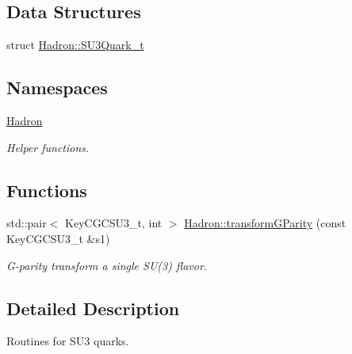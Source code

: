 \subsection*{Data Structures}
\begin{DoxyCompactItemize}
\item 
struct \mbox{\hyperlink{structHadron_1_1SU3Quark__t}{Hadron\+::\+S\+U3\+Quark\+\_\+t}}
\end{DoxyCompactItemize}
\subsection*{Namespaces}
\begin{DoxyCompactItemize}
\item 
 \mbox{\hyperlink{namespaceHadron}{Hadron}}
\begin{DoxyCompactList}\small\item\em Helper functions. \end{DoxyCompactList}\end{DoxyCompactItemize}
\subsection*{Functions}
\begin{DoxyCompactItemize}
\item 
std\+::pair$<$ Key\+C\+G\+C\+S\+U3\+\_\+t, int $>$ \mbox{\hyperlink{namespaceHadron_ae0f88dc43657f9dd4f118d41608859cc}{Hadron\+::transform\+G\+Parity}} (const Key\+C\+G\+C\+S\+U3\+\_\+t \&s1)
\begin{DoxyCompactList}\small\item\em G-\/parity transform a single S\+U(3) flavor. \end{DoxyCompactList}\end{DoxyCompactItemize}


\subsection{Detailed Description}
Routines for S\+U3 quarks. 


